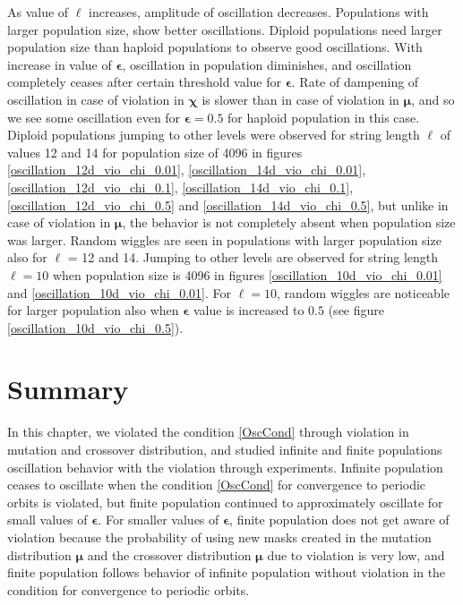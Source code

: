 As value of $\ell$ increases, amplitude of oscillation decreases. 
Populations with larger population size, show better oscillations. 
Diploid populations need larger population size than haploid populations to observe good oscillations. 
With increase in value of $\bm{\epsilon}$, 
oscillation in population diminishes, and oscillation completely ceases after certain threshold value for $\bm{\epsilon}$. 
Rate of dampening of oscillation in case of violation in $\bm{\chi}$ is slower than in case of violation in ${\bm{\mu}}$, 
and so we see some oscillation even for $\bm{\epsilon} = 0.5$ for haploid population in this case. 
Diploid populations jumping to other levels 
were observed for string length $\ell$ of values 12 and 14 for population size of 4096 in 
figures \ref{oscillation_12d_vio_chi_0.01}, \ref{oscillation_14d_vio_chi_0.01}, \ref{oscillation_12d_vio_chi_0.1}, 
\ref{oscillation_14d_vio_chi_0.1}, \ref{oscillation_12d_vio_chi_0.5} and \ref{oscillation_14d_vio_chi_0.5}, 
but unlike in case of violation in $\bm{\mu}$, the behavior is not completely absent when population size was larger. 
Random wiggles are seen in populations with larger population size also for $\ell$ = 12 and 14. 
Jumping to other levels are observed for string length $\ell = 10$ when population size is 4096 in figures \ref{oscillation_10d_vio_chi_0.01} 
and \ref{oscillation_10d_vio_chi_0.01}.
For $\ell = 10$, random wiggles are 
noticeable for larger population also when $\bm{\epsilon}$ value is increased to $0.5$ (see figure \ref{oscillation_10d_vio_chi_0.5}).


\section{Summary}
In this chapter, we violated the condition \ref{OscCond} through violation in mutation and crossover distribution, and 
studied infinite and finite populations oscillation behavior with the violation through experiments. 
Infinite population ceases to oscillate when the condition \ref{OscCond} for convergence to 
periodic orbits is violated, but finite population continued to approximately oscillate for small values of $\bm{\epsilon}$. 
For smaller values of $\bm{\epsilon}$, finite population does not get aware of violation because the probability of using 
new masks created in the mutation distribution $\bm{\mu}$ and the crossover distribution $\bm{\mu}$ due to violation is very low, and 
finite population follows behavior of infinite population without violation in the condition for convergence to 
periodic orbits.





 
